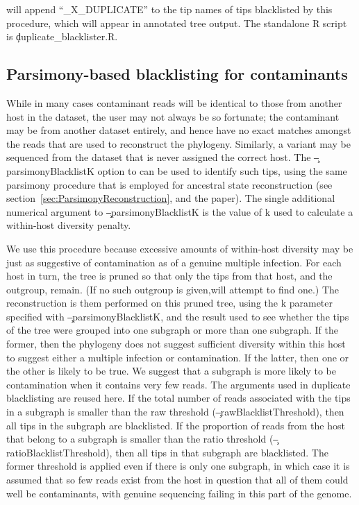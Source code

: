\pat will append ``\_X\_DUPLICATE'' to the tip names of tips blacklisted by this procedure, which will appear in annotated tree output.
The standalone R script is \c{duplicate\_blacklister.R}.

\subsection{Parsimony-based blacklisting for contaminants}

While in many cases contaminant reads will be identical to those from another host in the dataset, the user may not always be so fortunate; the contaminant may be from another dataset entirely, and hence have no exact matches amongst the reads that are used to reconstruct the phylogeny.
Similarly, a variant may be sequenced from the dataset that is never assigned the correct host.
The \c{--parsimonyBlacklistK} option to \pat can be used to identify such tips, using the same parsimony procedure that is employed for ancestral state reconstruction (see section~\ref{sec:ParsimonyReconstruction}, and the \p paper).
The single additional numerical argument to \c{--parsimonyBlacklistK} is the value of k used to calculate a within-host diversity penalty.

We use this procedure because excessive amounts of within-host diversity may be just as suggestive of contamination as of a genuine multiple infection.
For each host in turn, the tree is pruned so that only the tips from that host, and the outgroup, remain.
(If no such outgroup is given,\break \pat will attempt to find one.) The reconstruction is them performed on this pruned tree, using the k parameter specified with \c{--parsimonyBlacklistK}, and the result used to see whether the tips of the tree were grouped into one subgraph or more than one subgraph.
If the former, then the phylogeny does not suggest sufficient diversity within this host to suggest either a multiple infection or contamination.
If the latter, then one or the other is likely to be true.
We suggest that a subgraph is more likely to be contamination when it contains very few reads.
The arguments used in duplicate blacklisting are reused here.
If the total number of reads associated with the tips in a subgraph is smaller than the raw threshold (\c{--rawBlacklistThreshold}), then all tips in the subgraph are blacklisted.
If the proportion of reads from the host that belong to a subgraph is smaller than the ratio threshold (\c{--ratioBlacklistThreshold}), then all tips in that subgraph are blacklisted.
The former threshold is applied even if there is only one subgraph, in which case it is assumed that so few reads exist from the host in question that all of them could well be contaminants, with genuine sequencing failing in this part of the genome.

